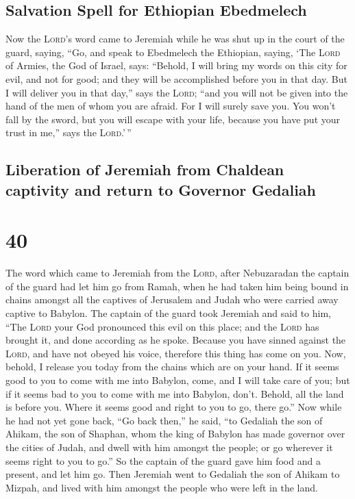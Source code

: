 \hypertarget{salvation-spell-for-ethiopian-ebedmelech}{%
\subsection{Salvation Spell for Ethiopian
Ebedmelech}\label{salvation-spell-for-ethiopian-ebedmelech}}

 Now the \textsc{Lord}'s word came to Jeremiah while he
was shut up in the court of the guard, saying,  ``Go, and
speak to Ebedmelech the Ethiopian, saying, `The \textsc{Lord} of Armies,
the God of Israel, says: ``Behold, I will bring my words on this city
for evil, and not for good; and they will be accomplished before you in
that day.  But I will deliver you in that day,'' says the
\textsc{Lord}; ``and you will not be given into the hand of the men of
whom you are afraid.  For I will surely save you. You
won't fall by the sword, but you will escape with your life, because you
have put your trust in me,'' says the \textsc{Lord}.'\,''

\hypertarget{liberation-of-jeremiah-from-chaldean-captivity-and-return-to-governor-gedaliah}{%
\subsection{Liberation of Jeremiah from Chaldean captivity and return to
Governor
Gedaliah}\label{liberation-of-jeremiah-from-chaldean-captivity-and-return-to-governor-gedaliah}}

\hypertarget{section-39}{%
\section{40}\label{section-39}}

 The word which came to Jeremiah from the \textsc{Lord},
after Nebuzaradan the captain of the guard had let him go from Ramah,
when he had taken him being bound in chains amongst all the captives of
Jerusalem and Judah who were carried away captive to Babylon.
 The captain of the guard took Jeremiah and said to him,
``The \textsc{Lord} your God pronounced this evil on this place;
 and the \textsc{Lord} has brought it, and done according
as he spoke. Because you have sinned against the \textsc{Lord}, and have
not obeyed his voice, therefore this thing has come on you.
 Now, behold, I release you today from the chains which
are on your hand. If it seems good to you to come with me into Babylon,
come, and I will take care of you; but if it seems bad to you to come
with me into Babylon, don't. Behold, all the land is before you. Where
it seems good and right to you to go, there go.''  Now
while he had not yet gone back, ``Go back then,'' he said, ``to Gedaliah
the son of Ahikam, the son of Shaphan, whom the king of Babylon has made
governor over the cities of Judah, and dwell with him amongst the
people; or go wherever it seems right to you to go.'' So the captain of
the guard gave him food and a present, and let him go. 
Then Jeremiah went to Gedaliah the son of Ahikam to Mizpah, and lived
with him amongst the people who were left in the land.

